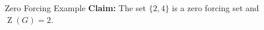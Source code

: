 \documentclass[final]{beamer}
\newcommand{\Z}{\operatorname{Z}}
\newcommand{\A}{\mathcal{A}}
\newcommand{\B}{\mathcal{B}}
\newcommand{\x}{\times}
\newcommand{\bit}{\begin{itemize}}
\newcommand{\eit}{\end{itemize}}
\newcommand{\ben}{\begin{enumerate}}
\newcommand{\een}{\end{enumerate}}
\def\mtx#1{\begin{bmatrix} #1 \end{bmatrix}}
\begin{document}
\begin{frame}{}
\begin{columns}[t]
\begin{column}{0.23\linewidth}
\begin{block}{Zero Forcing Example}
\textbf{Claim:} The set $\{2,4\}$ is a zero forcing set and $\Z(G) = 2$.
\begin{figure}[h!]
\centering
{}
\end{figure}

\end{block}


\end{column}%

\begin{column}{0.38\linewidth}
 

\end{column}
\end{columns}
\end{frame}
\end{document}
